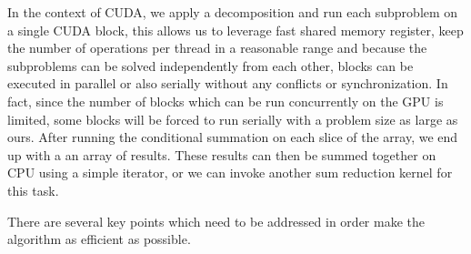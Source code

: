 \documentclass[]{article}
\begin{document}
In the context of CUDA, we apply a decomposition and run each subproblem on a single CUDA block, this allows us to leverage fast shared memory register, keep the number of operations per thread in a reasonable range and because the subproblems can be solved independently from each other, blocks can be executed in parallel or also serially without any conflicts or synchronization. In fact, since the number of blocks which can be run concurrently on the GPU is limited, some blocks will be forced to run serially with a problem size as large as ours.  After running the conditional summation on each slice of the array, we end up with a an array of results. These results can then be summed together on CPU using a simple iterator, or we can invoke another sum reduction kernel for this task.

There are several key points which need to be addressed in order make the algorithm as efficient as possible. 
\end{document}
